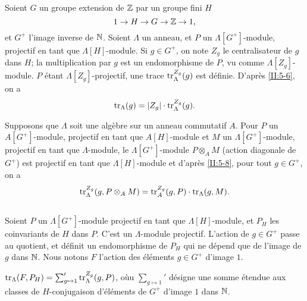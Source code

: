 \subsection{}\label{II:5-9}

Soient $G$ un groupe extension de $\mathbb{Z}$ par un groupe fini $H$
\[
  1 \to H \to G \to \mathbb{Z} \to 1 \text{,}
\]
et $G^+$ l'image inverse de $\mathbb{N}$. Soient $\Lambda$ un anneau, et $P$ un 
$\Lambda[G^+]$-module, projectif en tant que $\Lambda[H]$-module. Si 
$g\in G^+$, on note $Z_g$ le centralisateur de $g$ dans $H$; la multiplication 
par $g$ est un endomorphisme de $P$, vu comme $\Lambda[Z_g]$-module. $P$ \'etant 
$\Lambda[Z_g]$-projectif, une trace $\operatorname{tr}_\Lambda^{Z_g}(g)$ est d\'efinie. 
D'apr\`es \ref{II:5-6}, on a 
\begin{equation}\label{II:eq:5-9-1}
  \operatorname{tr}_\Lambda(g) = |Z_g| \cdot \operatorname{tr}_\Lambda^{Z_g}(g) \text{.}
\end{equation}

Supposons que $\Lambda$ soit une alg\`ebre sur un anneau commutatif $A$. Pour 
$P$ un $A[G^+]$-module, projectif en tant que $A[H]$-module et $M$ un 
$\Lambda[G^+]$-module, projectif en tant que $\Lambda$-module, le 
$\Lambda[G^+]$-module $P\otimes_A M$ (action diagonale de $G^+$) est projectif 
en tant que $\Lambda[H]$-module et d'apr\`es \ref{II:5-8}, pour tout 
$g\in G^+$, on a 
\begin{equation}\label{II:eq:5-9-2}
  \operatorname{tr}_\Lambda^{Z_g}(g,P\otimes_A M) = \operatorname{tr}_A^{Z_g}(g,P) \cdot \operatorname{tr}_\Lambda(g,M) \text{.}
\end{equation}





\subsection{}\label{II:5-10}

Soient $P$ un $\Lambda[G^+]$-module projectif en tant que $\Lambda[H]$-module, 
et $P_H$ les coinvariants de $H$ dans $P$. C'est un $\Lambda$-module projectif. 
L'action de $g\in G^+$ passe au quotient, et d\'efinit un endomorphisme de 
$P_H$ qui ne d\'epend que de l'image de $g$ dans $\mathbb{N}$. Nous notons $F$ 
l'action des \'el\'ements $g\in G^+$ d'image $1$. 





\begin{proposition_}\label{II:5-11}
$\operatorname{tr}_\Lambda(F,P_H) = \sum_{g\mapsto 1}' \operatorname{tr}_\Lambda^{Z_g}(g,P)$, o\`uu 
$\sum_{g\mapsto 1}'$ d\'esigne une somme \'etendue aux classes de 
$H$-conjugaison d'\'el\'ements de $G^+$ d'image $1$ dans $\mathbb{N}$. 
\end{proposition_}


